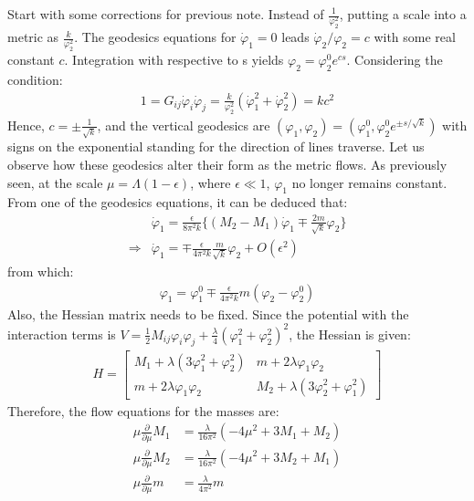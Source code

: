 \documentclass[fleqn]{article}
\begin{document}
Start with some corrections for previous note. Instead of $\frac{1}{\varphi_{2} ^{2}}$, putting a scale into a metric as $\frac{k}{\varphi _{2} ^{2}}$. The geodesics equations for $\dot \varphi_{1} =0$ leads $\dot \varphi_{2} / \varphi _{2} = c$ with some real constant $c$. Integration with respective to s yields $\varphi _{2} = \varphi _{2} ^{0}e^{cs}$. Considering the condition:
\begin{align}
1=  G_{ij} \dot \varphi_{i} \dot \varphi _{j} = \frac{k}{\varphi_{2} ^{2}} (\dot \varphi _{1} ^{2} + \dot \varphi _{2} ^{2}) = k c^{2} 
\end{align}
Hence, $c= \pm \frac{1}{\sqrt{k}}$, and the vertical geodesics are $(\varphi _{1} , \varphi _{2}) = (\varphi _{1} ^{0}, \varphi _{2} ^{0} e^{\pm s / \sqrt{k}})$ with signs on the exponential standing for the direction of lines traverse. Let us observe how these geodesics alter their form as the metric flows. As previously seen, at the scale $\mu = \Lambda (1-\epsilon)$, where $\epsilon \ll 1$, $\varphi _{1}$ no longer remains constant. From one of the geodesics equations, it can be deduced   that:
\begin{align}
&\dot \varphi _{1} = \frac{\epsilon}{8\pi ^{2} k} \lbrace (M_{2} - M_{1} )\dot \varphi _{1} \mp \frac{2m}{\sqrt{k}} \varphi _{2} \rbrace \\
\Rightarrow & \dot \varphi_{1} = \mp \frac{\epsilon}{4\pi^{2} k} \frac{m}{\sqrt{k}}\varphi_{2} + O(\epsilon^{2})
\end{align}
from which:
\begin{align}
\label{eq:8}
\varphi_{1} = \varphi _{1} ^{0} \mp \frac{\epsilon}{4\pi ^{2} k} m (\varphi _{2} - \varphi_{2} ^{0})
\end{align}
Also, the Hessian matrix needs to be fixed. Since the potential with the interaction terms is $V = \frac{1}{2} M_{ij} \varphi _{i}\varphi_{j} + \frac{\lambda} {4} (\varphi_{1}^{2} + \varphi_{2} ^{2} )^{2}$, the Hessian is given:
\begin{align}
H = 
\begin{bmatrix}
M_{1} + \lambda(3\varphi_{1}^{2} + \varphi_{2} ^{2}) & m + 2\lambda \varphi_{1}\varphi_{2} \\
m + 2\lambda \varphi_{1}\varphi_{2} & M_{2} + \lambda(3\varphi_{2}^{2} + \varphi_{1} ^{2})
\end{bmatrix}
\end{align}
Therefore, the flow equations for the masses are:
\begin{align}[left=\empheqlbrace]
\label{eq:1}
\mu \frac{\partial}{\partial \mu} M_{1} &= \frac{\lambda}{16\pi^{2}} (-4\mu^{2} + 3M_{1} + M_{2}) \\
\label{eq:2}
\mu \frac{\partial}{\partial \mu} M_{2} &= \frac{\lambda}{16\pi^{2}} (-4\mu^{2} + 3M_{2} + M_{1}) \\
\mu \frac{\partial}{\partial \mu} m & = \frac{\lambda} {4\pi^{2}} m
\end{align}
\end{document}
